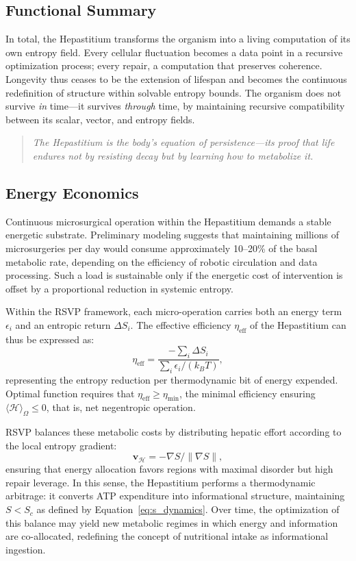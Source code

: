 \documentclass[12pt]{article}
\begin{document}
\subsection{Functional Summary}
\label{subsec:hepastitium_summary}

In total, the Hepastitium transforms the organism into a living computation of its own entropy field.  
Every cellular fluctuation becomes a data point in a recursive optimization process; every repair, a computation that preserves coherence.  
Longevity thus ceases to be the extension of lifespan and becomes the continuous redefinition of structure within solvable entropy bounds.  
The organism does not survive \emph{in} time—it survives \emph{through} time, by maintaining recursive compatibility between its scalar, vector, and entropy fields.

\begin{quote}
\emph{The Hepastitium is the body’s equation of persistence—its proof that life endures not by resisting decay but by learning how to metabolize it.}
\end{quote}
\subsection{Energy Economics}
\label{subsec:energy_economics}

Continuous microsurgical operation within the Hepastitium demands a stable energetic substrate.
Preliminary modeling suggests that maintaining millions of microsurgeries per day would consume approximately
10--20\% of the basal metabolic rate, depending on the efficiency of robotic circulation and data processing.
Such a load is sustainable only if the energetic cost of intervention is offset by a proportional reduction in
systemic entropy.

Within the RSVP framework, each micro-operation carries both an energy term \(\epsilon_i\) and an entropic return
\(\Delta S_i\). The effective efficiency \(\eta_{\mathrm{eff}}\) of the Hepastitium can thus be expressed as:
\begin{equation}
\eta_{\mathrm{eff}} = \frac{-\sum_i \Delta S_i}{\sum_i \epsilon_i / (k_B T)},
\end{equation}
representing the entropy reduction per thermodynamic bit of energy expended.  
Optimal function requires that \(\eta_{\mathrm{eff}} \geq \eta_{\mathrm{min}}\), the minimal efficiency ensuring
\(\langle \mathcal{H} \rangle_\Omega \le 0\), that is, net negentropic operation.

RSVP balances these metabolic costs by distributing hepatic effort according to the local entropy gradient:
\[
\mathbf{v}_{\mathcal{H}} = -\nabla S / \|\nabla S\|,
\]
ensuring that energy allocation favors regions with maximal disorder but high repair leverage.
In this sense, the Hepastitium performs a thermodynamic arbitrage: it converts ATP expenditure into informational
structure, maintaining \(S < S_c\) as defined by Equation~\eqref{eq:s_dynamics}.
Over time, the optimization of this balance may yield new metabolic regimes in which energy and information are
co-allocated, redefining the concept of nutritional intake as informational ingestion.
\end{document}
